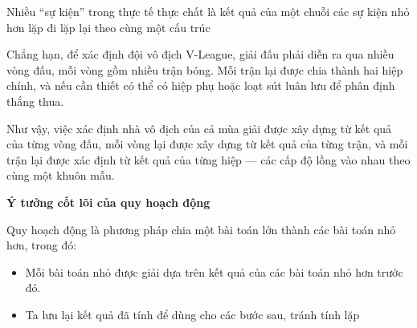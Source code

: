 \documentclass[12pt, a4paper]{article}
\begin{document}
		\vspace{0.3cm}
		
		\noindent Nhiều “sự kiện” trong thực tế thực chất là kết quả của một chuỗi các sự kiện nhỏ hơn lặp đi lặp lại theo cùng một cấu trúc
		
		\vspace{0.3cm}
		
		\noindent Chẳng hạn, để xác định đội vô địch V-League, giải đấu phải diễn ra qua nhiều vòng đấu, mỗi vòng gồm nhiều trận bóng. Mỗi trận lại được chia thành hai hiệp chính, và nếu cần thiết có thể có hiệp phụ hoặc loạt sút luân lưu để phân định thắng thua.
		
		\vspace{0.3cm}
		
		\noindent Như vậy, việc xác định nhà vô địch của cả mùa giải được xây dựng từ kết quả của từng vòng đấu, mỗi vòng lại được xây dựng từ kết quả của từng trận, và mỗi trận lại được xác định từ kết quả của từng hiệp — các cấp độ lồng vào nhau theo cùng một khuôn mẫu.
		
		\vspace{0.5cm}
		
		
		\vspace{0.2cm}
		
			\noindent{}	
		\vspace{0.5cm}
		
		
		\vspace{0.2cm}
		
		\noindent \textbf{Ý tưởng cốt lõi của quy hoạch động}
		
		\noindent Quy hoạch động là phương pháp chia một bài toán lớn thành các bài toán nhỏ hơn, trong đó:
		\begin{itemize}
			\item Mỗi bài toán nhỏ được giải dựa trên kết quả của các bài toán nhỏ hơn trước đó.
			\item Ta lưu lại kết quả đã tính để dùng cho các bước sau, tránh tính lặp
		\end{itemize}
		
\end{document}
